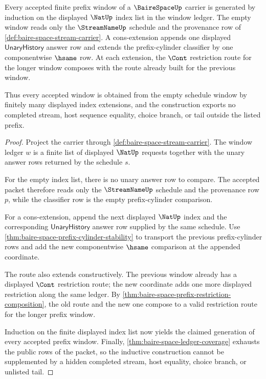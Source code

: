 \begin{theorem}
\label{thm:baire-space-prefix-window-induction}
Every accepted finite prefix window of a $\BaireSpaceUp$ carrier is generated by
induction on the displayed $\NatUp$ index list in the window ledger. The empty
window reads only the $\StreamNameUp$ schedule and the provenance row of
\autoref{def:baire-space-stream-carrier}. A cons-extension appends one
displayed $\mathsf{UnaryHistory}$ answer row and extends the prefix-cylinder
classifier by one componentwise $\hsame$ row. At each extension, the
$\Cont$ restriction route for the longer window composes with the route
already built for the previous window.

Thus every accepted window is obtained from the empty schedule window by
finitely many displayed index extensions, and the construction exports no
completed stream, host sequence equality, choice branch, or tail outside the
listed prefix.
\end{theorem}
\begin{proof}
Project the carrier through \autoref{def:baire-space-stream-carrier}. The
window ledger $w$ is a finite list of displayed $\NatUp$ requests together with
the unary answer rows returned by the schedule $s$.

For the empty index list, there is no unary answer row to compare. The accepted
packet therefore reads only the $\StreamNameUp$ schedule and the provenance row
$p$, while the classifier row is the empty prefix-cylinder comparison.

For a cons-extension, append the next displayed $\NatUp$ index and the
corresponding $\mathsf{UnaryHistory}$ answer row supplied by the same schedule.
Use \autoref{thm:baire-space-prefix-cylinder-stability} to transport the
previous prefix-cylinder rows and add the new componentwise $\hsame$ comparison
at the appended coordinate.

The route also extends constructively. The previous window already has a
displayed $\Cont$ restriction route; the new coordinate adds one more displayed
restriction along the same ledger. By
\autoref{thm:baire-space-prefix-restriction-composition}, the old route and the
new one compose to a valid restriction route for the longer prefix window.

Induction on the finite displayed index list now yields the claimed generation
of every accepted prefix window. Finally,
\autoref{thm:baire-space-ledger-coverage} exhausts the public rows of the
packet, so the inductive construction cannot be supplemented by a hidden
completed stream, host equality, choice branch, or unlisted tail.
\end{proof}


